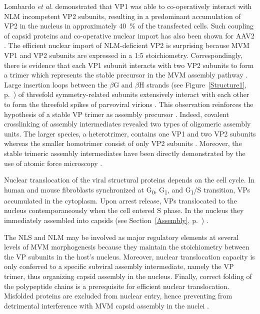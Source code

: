 Lombardo \textit{et al.} demonstrated that VP1 was able to co-operatively interact with NLM incompetent VP2 subunits, resulting in a predominant accumulation of VP2 in the nucleus in approximately 40~\% of the transfected cells. Such coupling of capsid proteins and co-operative nuclear import has also been shown for AAV2 \cite{pmid1331503}. The efficient nuclear import of NLM-deficient VP2 is surprising because MVM VP1 and VP2 subunits are expressed in a 1:5 stoichiometry. Correspondingly, there is evidence that each VP1 subunit interacts with two VP2 subunits to form a trimer which represents the stable precursor in the MVM assembly pathway \cite{pmid10729155}. Large insertion loops between the $\beta$G and $\beta$H strands (see Figure~\ref{Structure1}, p.~\pageref{Structure1}) of threefold symmetry-related subunits extensively interact with each other \cite{pmid8377200, pmid8969301} to form the threefold spikes of parvoviral virions \cite{pmid9817841, pmid2006420}. This observation reinforces the hypothesis of a stable VP trimer as assembly precursor \cite{pmid10729155}. Indeed, covalent crosslinking of assembly intermediates revealed two types of oligomeric assembly units. The larger species, a heterotrimer, contains one VP1 and two VP2 subunits whereas the smaller homotrimer consist of only VP2 subunits \cite{pmid16469332}. Moreover, the stable trimeric assembly intermediates have been directly demonstrated by the use of atomic force microscopy \cite{pmid22713577}.     

Nuclear translocation of the viral structural proteins depends on the cell cycle. In human and mouse fibroblasts synchronized at G\textsubscript{0}, G\textsubscript{1}, and G\textsubscript{1}/S transition, VPs accumulated in the cytoplasm. Upon arrest release, VPs translocated to the nucleus contemporaneously when the cell entered S phase. In the nucleus they immediately assembled into capsids (see Section~\ref{Assembly}, p.~\pageref{Assembly}) \cite{pmid26067441}.


The NLS and NLM may be involved as major regulatory elements at several levels of MVM morphogenesis because they maintain the stoichiometry between the VP subunits in the host's nucleus. Moreover, nuclear translocation capacity is only conferred to a specific subviral assembly intermediate, namely the VP trimer, thus organizing capsid assembly in the nucleus. Finally, correct folding of the polypeptide chains is a prerequisite for efficient nuclear translocation. Misfolded proteins are excluded from nuclear entry, hence preventing from detrimental interference with MVM capsid assembly in the nuclei \cite{pmid10729155}.

